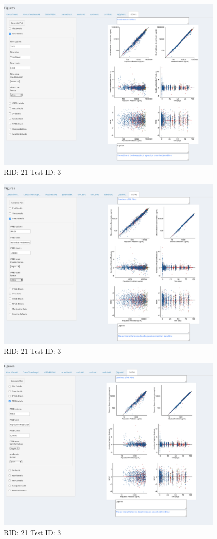 \begin{figure}[H]
\includegraphics[width=.8\textwidth]{screencaps/21-3-2.png}
\caption{RID: 21 Test ID: 3}
\end{figure}
\begin{figure}[H]
\includegraphics[width=.8\textwidth]{screencaps/21-3-3.png}
\caption{RID: 21 Test ID: 3}
\end{figure}
\begin{figure}[H]
\includegraphics[width=.8\textwidth]{screencaps/21-3-4.png}
\caption{RID: 21 Test ID: 3}
\end{figure}
